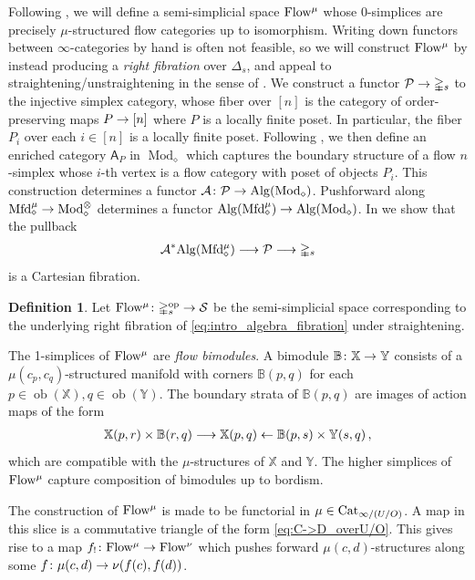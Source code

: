 \documentclass[10pt]{amsart}
\numberwithin{equation}{section}
\theoremstyle{definition}
\newtheorem{definition}[prop]{Definition}
\DeclareMathOperator{\Mod}{Mod}
\DeclareMathOperator{\ob}{ob}
\DeclareMathOperator{\op}{op}
\newcommand{\PreFlow}{\mathrm{Flow}\vphantom{w}}
\newcommand{\Cat}{\mathrm{Cat}\vphantom{t}}
\newcommand{\Mfd}{\mathrm{Mfd}\vphantom{d}}
\newcommand{\Alg}{\mathrm{Alg}\vphantom{z}}
\newcommand{\bB}{\mathbb{B}}
\newcommand{\bX}{\mathbb{X}}
\newcommand{\bY}{\mathbb{Y}}
\newcommand{\Simp}{\mathbb{\Delta}}
\newcommand{\cA}{\mathcal{A}}
\newcommand{\cP}{\mathcal{P}}
\newcommand{\cS}{\mathcal{S}}
\newcommand{\sfA}{\mathsf{A}}
\renewcommand{\to}{\mathchoice{\longrightarrow}{\rightarrow}{}{}}
\begin{document}
 Following \cite{AB}, we will define a semi-simplicial space $\PreFlow^{\mu}$ whose $0$-simplices are precisely $\mu$-structured flow categories up to isomorphism.
 Writing down functors between $\infty$-categories by hand is often not feasible, so we will construct $\PreFlow^{\mu}$ by instead producing a \emph{right fibration} over $\Simp_{s}$, and appeal to straightening/unstraightening in the sense of \cite{HTT}.
 We construct a functor $\cP \to \Simp_{s}$ to the injective simplex category, whose fiber over $[n]$ is the category of order-preserving maps $P\to [n]$ where $P$ is a locally finite poset.
 In particular, the fiber $P_{i}$ over each $i\in [n]$ is a locally finite poset.
 Following \cite{AB}, we then define an enriched category $\sfA_{P}$ in $\Mod_{\diamond}$ which captures the boundary structure of a flow $n$-simplex whose $i$-th vertex is a flow category with poset of objects $P_{i}$.
This construction determines a functor $\cA\colon \cP \to \Alg(\Mod_{\diamond})$.
Pushforward along $\Mfd^{\mu}_{\diamond}\to \Mod_{\diamond}^{\otimes}$ determines a functor $\Alg(\Mfd_{\diamond}^{\mu}) \to \Alg(\Mod_{\diamond})$. In  we show that the pullback
\begin{align}\label{eq:intro_algebra_fibration}
	\cA^{*}\Alg(\Mfd_{\diamond}^{\mu}) \to \cP \to \Simp_{s}
\end{align}
is a Cartesian fibration.

\begin{definition}\label{def:intro_Flow^mu}
	Let $\PreFlow^{\mu}\colon \Simp_{s}^{\op} \to \cS$ be the semi-simplicial space corresponding to the underlying right fibration of \eqref{eq:intro_algebra_fibration} under straightening.
\end{definition}
The 1-simplices of $\PreFlow^{\mu}$ are \emph{flow bimodules}.
A bimodule $\bB\colon \bX \to \bY$ consists of a $\mu(c_{p},c_{q})$-structured manifold with corners $\bB(p,q)$ for each $p\in \ob(\bX),q\in \ob(\bY)$.
The boundary strata of $\bB(p,q)$ are images of action maps of the form
\begin{align*}
	\bX(p,r)\times \bB(r,q) \to \bX(p,q) \leftarrow \bB(p,s) \times \bY(s,q) \,,
\end{align*}
which are compatible with the $\mu$-structures of $\bX$ and $\bY$.
The higher simplices of $\PreFlow^{\mu}$ capture composition of bimodules up to bordism.

The construction of $\PreFlow^{\mu}$ is made to be functorial in $\mu \in \Cat_{\infty / (U/O)}$.
A map in this slice is a commutative triangle of the form \eqref{eq:C->D_overU/O}.
This gives rise to a map $f_{!}\colon \PreFlow^{\mu} \to \PreFlow^{\nu}$ which pushes forward $\mu(c,d)$-structures along some $f\colon \mu(c,d) \to \nu(f(c),f(d)  )$.
\end{document}
